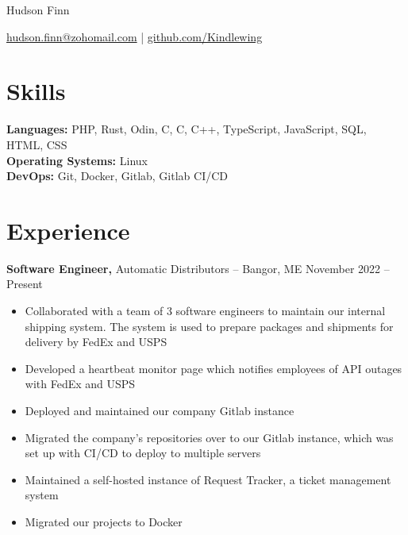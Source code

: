 \documentclass[11pt]{article}       %
\newcommand{\CS}{C\nolinebreak\hspace{-.05em}\raisebox{.6ex}{\scriptsize\bf \#}}
\begin{document}
\centerline{\Huge Hudson Finn}

\vspace{5pt}

\centerline{\href{mailto:hudson.finn@zohomail.com}{hudson.finn@zohomail.com} | \href{https://github.com/Kindlewing}{github.com/Kindlewing}}

\vspace{-10pt}

\section*{Skills}
 \begin{itemize}[leftmargin=0.15in, label={}]
\small{\item{
    \textbf{Languages:} PHP, Rust, Odin, \CS, C, C++, TypeScript, JavaScript, SQL, HTML, CSS \\
    \textbf{Operating Systems:} Linux \\
    \textbf{DevOps:} Git, Docker, Gitlab, Gitlab CI/CD
}}
\end{itemize}
\vspace{-6.5pt}

\section*{Experience}
\textbf{Software Engineer,} {Automatic Distributors} -- Bangor, ME \hfill November 2022 -- Present \\
\vspace{-9pt}
\begin{itemize}
    \item{Collaborated with a team of 3 software engineers to maintain our internal shipping system.
        The system is used to prepare packages and shipments for delivery by FedEx and USPS}
    \item{Developed a heartbeat monitor page which notifies employees of API outages with FedEx and USPS}
    \item{Deployed and maintained our company Gitlab instance}
    \item{Migrated the company's repositories over to our Gitlab instance, 
        which was set up with CI/CD to deploy to multiple servers}
    \item{Maintained a self-hosted instance of Request Tracker, a ticket management system}
    \item{Migrated our projects to Docker}
\end{itemize}
\end{document}
